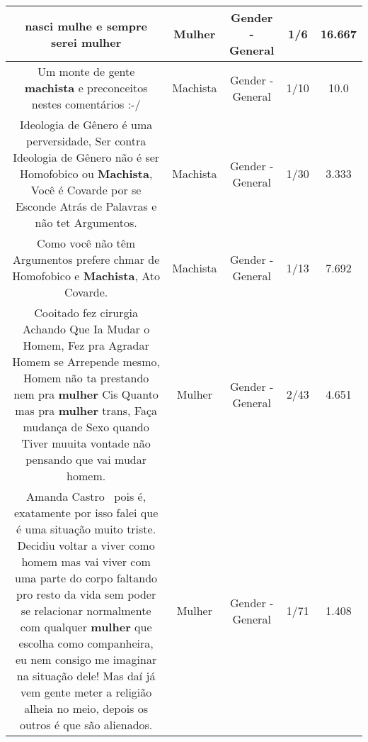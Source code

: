 \documentclass[11pt]{article}
\newlength\mylength
\begin{document}
\begin{center}
\begin{longtable}{|C{.65\mylength}|C{.30\mylength}|C{.12\mylength}|C{.12\mylength}|C{.12\mylength}|}
  \small nasci mulhe e sempre serei mulher\normalsize   & Mulher & Gender - General & 1/6 & 16.667 \\  \hline
  \small Um monte de gente \textbf{machista} e preconceitos nestes comentários :-/\normalsize   & Machista & Gender - General & 1/10 & 10.0 \\  \hline
  \small Ideologia de Gênero é uma perversidade, Ser contra Ideologia de Gênero não é ser Homofobico ou \textbf{Machista}, Você é Covarde por se Esconde Atrás de Palavras e não tet Argumentos.\normalsize   & Machista & Gender - General & 1/30 & 3.333 \\  \hline
  \small Como você  não têm Argumentos prefere chmar de Homofobico e \textbf{Machista}, Ato Covarde.\normalsize   & Machista & Gender - General & 1/13 & 7.692 \\  \hline
  \small Cooitado fez cirurgia Achando Que Ia Mudar o Homem, Fez pra Agradar Homem se Arrepende mesmo, Homem não ta prestando nem pra \textbf{mulher} Cis Quanto mas pra \textbf{mulher} trans, Faça mudança de Sexo quando Tiver muuita vontade não pensando que vai mudar homem.\normalsize   & Mulher & Gender - General & 2/43 & 4.651 \\  \hline
  \small Amanda Castro  pois é, exatamente por isso falei que é uma situação muito triste. Decidiu voltar a viver como homem mas vai viver com uma parte do corpo faltando pro resto da vida sem poder se relacionar normalmente com qualquer \textbf{mulher} que escolha como companheira, eu nem consigo me imaginar na situação dele! Mas daí já vem gente meter a religião alheia no meio, depois os outros é que são alienados.\normalsize   & Mulher & Gender - General & 1/71 & 1.408 \\  \hline

\end{longtable}
\end{center}
\end{document}
